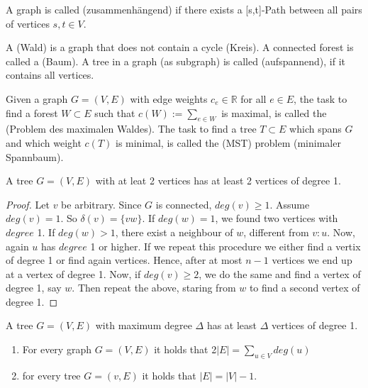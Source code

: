 
\setcounter{lecture}{1}
\setcounter{section}{2}

\begin{lec}[2011-10-13]\end{lec}


\begin{defn}[connected]
A graph is called  (zusammenhängend) if there exists a [s,t]-Path between all pairs of vertices $s,t \in V$.
\end{defn}

\begin{defn}
A  (Wald) is a graph that does not contain a cycle (Kreis). A connected forest is called a  (Baum). A tree in a graph (as subgraph) is called  (aufspannend), if it contains all vertices.

Given a graph $G=(V,E)$ with edge weights $c_e \in \mathbb{R}$ for all $e \in E$, the task to find a forest $W \subset E$ such that $c(W):=\sum\limits_{e\in W} $ is maximal, is called the  (Problem des maximalen Waldes). 
The task to find a tree $T\subset E$ which spans $G$ and which weight $c(T)$ is minimal, is called the  (MST) problem (minimaler Spannbaum).
\end{defn}

\begin{lem}
A tree $G=(V,E)$ with at leat 2 vertices has at least 2 vertices of degree 1.
\end{lem}
\begin{proof}
Let $v$ be arbitrary. Since $G$ is connected, $deg(v) \geq 1$. Assume $deg(v)=1$. So $\delta(v)=\{vw\}$. If $deg(w)=1$, we found two vertices with $degree$ 1. If $deg(w)>1$, there exist a neighbour of $w$, different from $v:u$. Now, again $u$ has $degree$ 1 or higher. If we repeat this procedure we either find a vertix of degree 1 or find again  vertices. Hence, after at most $n-1$ vertices we end up at a vertex of degree 1. 
Now, if $deg(v) \geq 2$, we do the same and find a vertex of degree 1, say $w$. Then repeat the above, staring from $w$ to find a second vertex of degree 1.
\end{proof}

\begin{cor}
A tree $G=(V,E)$ with maximum degree $\Delta$ has at least $\Delta$ vertices of degree 1.
\end{cor}

\begin{lem}
	\begin{enumerate}
	\item For every graph $G=(V,E)$ it holds that 2$|E|=\sum\limits_{u \in V} deg(u)$
	\item for every tree $G=(v,E)$ it holds that $|E|=|V|-1$.
	\end{enumerate}
	\end{lem}


